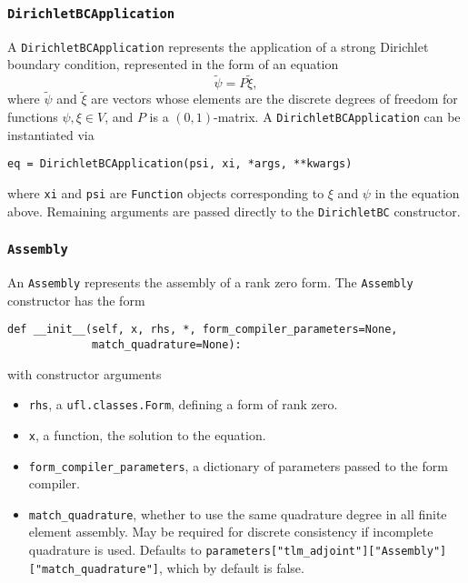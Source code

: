 \documentclass[11pt]{article}
\begin{document}
\subsubsection{\texttt{DirichletBCApplication}}

A \texttt{DirichletBCApplication} represents the application of a strong
Dirichlet boundary condition, represented in the form of an equation
\begin{equation*}
  \tilde{\psi} = P \tilde{\xi},
\end{equation*}
where $\tilde{\psi}$ and $\tilde{\xi}$ are vectors whose elements are the
discrete degrees of freedom for functions $\psi, \xi \in V$, and $P$ is a
$\left( 0, 1 \right)$-matrix. A \texttt{DirichletBCApplication} can be
instantiated via
\begin{lstlisting}
eq = DirichletBCApplication(psi, xi, *args, **kwargs)
\end{lstlisting}
where \texttt{xi} and \texttt{psi} are \texttt{Function} objects corresponding
to $\xi$ and $\psi$ in the equation above. Remaining arguments are passed
directly to the \texttt{DirichletBC} constructor.

\subsubsection{\texttt{Assembly}}\label{sect:Assembly}

An \texttt{Assembly} represents the assembly of a rank zero form. The
\texttt{Assembly} constructor has the form
\begin{lstlisting}
def __init__(self, x, rhs, *, form_compiler_parameters=None,
             match_quadrature=None):
\end{lstlisting}
with constructor arguments
\begin{itemize}
  \item \texttt{rhs}, a \texttt{ufl.classes.Form}, defining a form of rank
    zero.
  \item \texttt{x}, a function, the solution to the equation.
  \item \texttt{form\_compiler\_parameters}, a dictionary of parameters passed
    to the form compiler.
  \item \texttt{match\_quadrature}, whether to use the same quadrature degree
    in all finite element assembly. May be required for discrete consistency if
    incomplete quadrature is used. Defaults to
    \texttt{parameters["tlm\_adjoint"]}\texttt{["Assembly"]}\texttt{["match\_quadrature"]},
    which by default is false.
\end{itemize}
\end{document}
